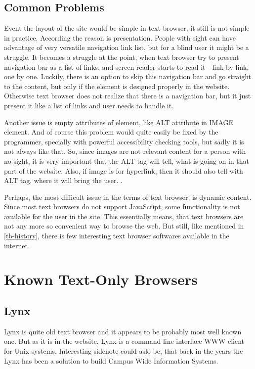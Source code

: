 \subsection{Common Problems}
\label{tb-problems}
Event the layout of the site would be simple in text browser, it still is not simple in practice. According \textcite[Chapter 5]{webbie} the reason is presentation. People with sight can have advantage of very versatile navigation link list, but for a blind user it might be a struggle. It becomes a struggle at the point, when text browser try to present navigation bar as a list of links, and screen reader starts to read it - link by link, one by one. Luckily, there is an option to skip this navigation bar and go straight to the content, but only if the element is designed properly in the website. Otherwise text browser does not realize that there is a navigation bar, but it just present it like a list of links and user needs to handle it.

Another issue is empty attributes of element, like ALT attribute in IMAGE element. And of course this problem would quite easily be fixed by the programmer, specially with powerful accessibility checking tools, but sadly it is not always like that. So, since images are not relevant content for a person with no sight, it is very important that the ALT tag will tell, what is going on in that part of the website. Also, if image is for hyperlink, then it should also tell with ALT tag, where it will bring the user. \parencite[Chapter 5]{webbie}.

Perhaps, the most difficult issue in the terms of text browser, is dynamic content. Since most text browsers do not support JavaScript, some functionality is not available for the user in the site. This essentially means, that text browsers are not any more so convenient way to browse the web. But still, like mentioned in \ref*{tb-history}, there is few interesting text browser softwares available in the internet.

\section{Known Text-Only Browsers}
\label{tb-browsers}
\subsection{Lynx}
\label{tb-lynx}
Lynx is quite old text browser and it appears to be probably most well known one. But as it is in the \textcite{lynx} website, Lynx is a command line interface WWW client for Unix systems. Interesting sidenote could aslo be, that back in the years the Lynx has been a solution to build Campus Wide Information Systems. 
